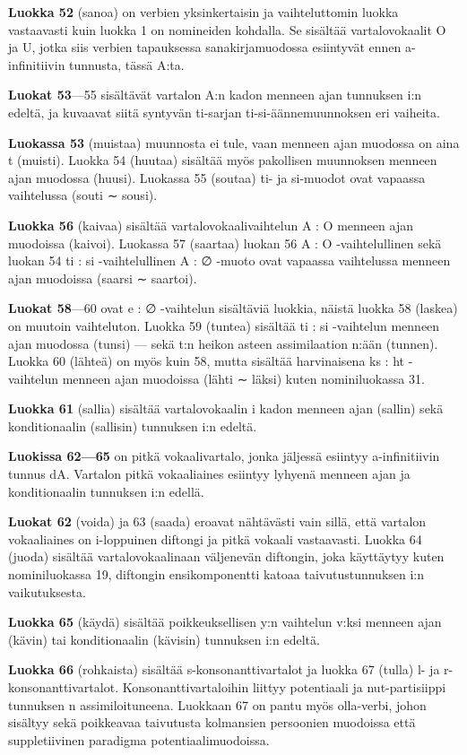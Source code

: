 \documentclass[free]{flammie}
\begin{document}
\textbf{Luokka 52} (sanoa) on verbien yksinkertaisin ja vaihteluttomin luokka vastaavasti
kuin luokka 1 on nomineiden kohdalla. Se sisältää vartalovokaalit O ja U, jotka
siis verbien tapauksessa sanakirjamuodossa esiintyvät ennen a-infinitiivin tunnusta, tässä A:ta.

\textbf{Luokat 53}—55 sisältävät vartalon A:n kadon menneen ajan tunnuksen i:n edeltä,
ja kuvaavat siitä syntyvän ti-sarjan ti-si-äännemuunnoksen eri vaiheita.

\textbf{Luokassa 53} (muistaa) muunnosta ei tule, vaan menneen ajan muodossa on aina
t (muisti). Luokka 54 (huutaa) sisältää myös pakollisen muunnoksen menneen
ajan muodossa (huusi). Luokassa 55 (soutaa) ti- ja si-muodot ovat vapaassa vaihtelussa (souti ∼ sousi).

\textbf{Luokka 56} (kaivaa) sisältää vartalovokaalivaihtelun A : O menneen ajan muodoissa (kaivoi). Luokassa 57 (saartaa) luokan 56 A : O -vaihtelullinen sekä luokan 54 ti : si -vaihtelullinen A : ∅ -muoto ovat vapaassa vaihtelussa menneen ajan
muodoissa (saarsi ∼ saartoi).

\textbf{Luokat 58}—60 ovat e : ∅ -vaihtelun sisältäviä luokkia, näistä luokka 58 (laskea) on muutoin vaihteluton. Luokka 59 (tuntea) sisältää ti : si -vaihtelun menneen ajan muodossa (tunsi) — sekä t:n heikon asteen assimilaation n:ään (tunnen). Luokka 60 (lähteä) on myös kuin 58, mutta sisältää harvinaisena ks : ht
-vaihtelun menneen ajan muodoissa (lähti ∼ läksi) kuten nominiluokassa 31.

\textbf{Luokka 61} (sallia) sisältää vartalovokaalin i kadon menneen ajan (sallin) sekä
konditionaalin (sallisin) tunnuksen i:n edeltä.

\textbf{Luokissa 62—65} on pitkä vokaalivartalo, jonka jäljessä esiintyy a-infinitiivin tunnus dA. Vartalon pitkä vokaaliaines esiintyy lyhyenä menneen ajan ja konditionaalin tunnuksen i:n edellä.

\textbf{Luokat 62} (voida) ja 63 (saada) eroavat nähtävästi vain sillä, että vartalon vokaaliaines on i-loppuinen diftongi ja pitkä vokaali vastaavasti. Luokka 64 (juoda) sisältää vartalovokaalinaan väljenevän diftongin, joka käyttäytyy kuten nominiluokassa 19, diftongin ensikomponentti katoaa taivutustunnuksen i:n vaikutuksesta.

\textbf{Luokka 65} (käydä) sisältää poikkeuksellisen y:n vaihtelun v:ksi menneen ajan
(kävin) tai konditionaalin (kävisin) tunnuksen i:n edeltä.

\textbf{Luokka 66} (rohkaista) sisältää s-konsonanttivartalot ja luokka 67 (tulla) l- ja
r-konsonanttivartalot. Konsonanttivartaloihin liittyy potentiaali ja nut-partisiippi
tunnuksen n assimiloituneena. Luokkaan 67 on pantu myös olla-verbi, johon sisältyy sekä poikkeavaa taivutusta kolmansien persoonien muodoissa että suppletiivinen paradigma potentiaalimuodoissa.
\end{document}
